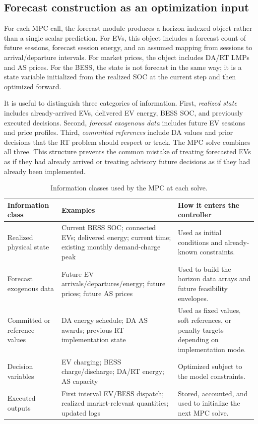 \documentclass[final,5p,times]{elsarticle}
\begin{document}
\subsection{Forecast construction as an optimization input}
For each MPC call, the forecast module produces a horizon-indexed object rather than a single scalar prediction. For EVs, this object includes a forecast count of future sessions, forecast session energy, and an assumed mapping from sessions to arrival/departure intervals. For market prices, the object includes DA/RT LMPs and AS prices. For the BESS, the state is not forecast in the same way; it is a state variable initialized from the realized SOC at the current step and then optimized forward.

It is useful to distinguish three categories of information. First, \emph{realized state} includes already-arrived EVs, delivered EV energy, BESS SOC, and previously executed decisions. Second, \emph{forecast exogenous data} includes future EV sessions and price profiles. Third, \emph{committed references} include DA values and prior decisions that the RT problem should respect or track. The MPC solve combines all three. This structure prevents the common mistake of treating forecasted EVs as if they had already arrived or treating advisory future decisions as if they had already been implemented.

\begin{table}[!t]
\centering
\caption{Information classes used by the MPC at each solve.}
\label{tab:information_classes}
\scriptsize
\begin{tabularx}{\textwidth}{@{}p{}p{}X@{}}
\toprule
Information class & Examples & How it enters the controller \\
\midrule
Realized physical state & Current BESS SOC; connected EVs; delivered energy; current time; existing monthly demand-charge peak & Used as initial conditions and already-known constraints.\\
Forecast exogenous data & Future EV arrivals/departures/energy; future prices; future AS prices & Used to build the horizon data arrays and future feasibility envelopes.\\
Committed or reference values & DA energy schedule; DA AS awards; previous RT implementation state & Used as fixed values, soft references, or penalty targets depending on implementation mode.\\
Decision variables & EV charging; BESS charge/discharge; DA/RT energy; AS capacity & Optimized subject to the model constraints.\\
Executed outputs & First interval EV/BESS dispatch; realized market-relevant quantities; updated logs & Stored, accounted, and used to initialize the next MPC solve.\\
\bottomrule
\end{tabularx}
\end{table}
\end{document}
